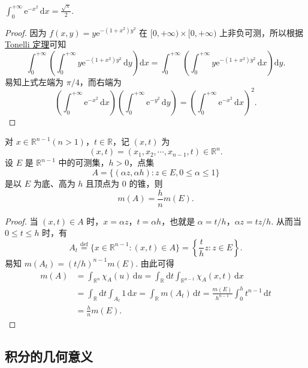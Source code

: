 \documentclass[../../main.tex]{subfiles}%
\begin{document}
\begin{example}
$\int_0^{+\infty} \mathrm{e}^{-x^2} \, \mathrm{d}x = \frac{\sqrt{\pi}}{2}.$
\end{example}
\begin{proof}
因为 \( f(x, y) = y \mathrm{e}^{-(1 + x^2)y^2} \) 在 \( [0, +\infty) \times [0, +\infty) \) 上非负可测，所以根据\hyperref[theorem:Tonelli定理(非负可测函数的情形)]{Tonelli 定理}可知
\[
\int_0^{+\infty} \left( \int_0^{+\infty} y \mathrm{e}^{-(1 + x^2)y^2} \, \mathrm{d}y \right) \mathrm{d}x = \int_0^{+\infty} \left( \int_0^{+\infty} y \mathrm{e}^{-(1 + x^2)y^2} \, \mathrm{d}x \right) \mathrm{d}y.
\]
易知上式左端为 \( \pi/4 \)，而右端为
\[
\left( \int_0^{+\infty} \mathrm{e}^{-x^2} \, \mathrm{d}x \right) \left( \int_0^{+\infty} \mathrm{e}^{-y^2} \, \mathrm{d}y \right) = \left( \int_0^{+\infty} \mathrm{e}^{-x^2} \, \mathrm{d}x \right)^2.
\]
\end{proof}

\begin{example}
对 \( x \in \mathbb{R}^{n - 1} (n > 1) \)，\( t \in \mathbb{R} \)，记 \( (x, t) \) 为
\[
(x, t) = (x_1, x_2, \cdots, x_{n - 1}, t) \in \mathbb{R}^n.
\]
设 \( E \) 是 \( \mathbb{R}^{n - 1} \) 中的可测集，\( h > 0 \)，点集
\[
A = \{ (\alpha z, \alpha h) : z \in E, 0 \leqslant \alpha \leqslant 1 \}
\]
是以 \( E \) 为底、高为 \( h \) 且顶点为 0 的锥，则
\[
m(A) = \frac{h}{n} m(E).
\]
\end{example}
\begin{proof}
当 \( (x, t) \in A \) 时，\( x = \alpha z \)，\( t = \alpha h \)，也就是 \( \alpha = t/h \)，\( \alpha z = t z / h \). 从而当 \( 0 \leqslant t \leqslant h \) 时，有
\[
A_t \stackrel{\text{def}}{=} \{ x \in \mathbb{R}^{n - 1} : (x, t) \in A \} = \left\{ \frac{t}{h} z : z \in E \right\}.
\]
易知 \( m(A_t) = (t/h)^{n - 1} m(E) \). 由此可得
\begin{align*}
m(A) &= \int_{\mathbb{R}^n} \chi_A(u) \, \mathrm{d}u = \int_{\mathbb{R}} \mathrm{d}t \int_{\mathbb{R}^{n - 1}} \chi_A(x, t) \, \mathrm{d}x \\
&= \int_{\mathbb{R}} \mathrm{d}t \int_{A_t} 1 \, \mathrm{d}x = \int_{\mathbb{R}} m(A_t) \, \mathrm{d}t = \frac{m(E)}{h^{n - 1}} \int_0^h t^{n - 1} \, \mathrm{d}t \\
&= \frac{h}{n} m(E).
\end{align*}
\end{proof}




\subsection{积分的几何意义}
\end{document}
